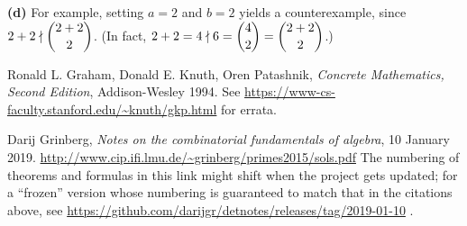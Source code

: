 \documentclass[paper=a4, fontsize=12pt]{scrartcl}%
\theoremstyle{plainsl}
\theoremstyle{definition}
\theoremstyle{remark}
\begin{document}
\textbf{(d)} For example, setting $a=2$ and $b=2$ yields a counterexample,
since $2+2\nmid\dbinom{2+2}{2}$. (In fact, $2+2=4\nmid6=\dbinom{4}{2}%
=\dbinom{2+2}{2}$.)

\begin{thebibliography}{99999999}                                                                                         %






Ronald L. Graham, Donald E. Knuth, Oren Patashnik,
\textit{Concrete Mathematics, Second Edition}, Addison-Wesley 1994.\newline
See \url{https://www-cs-faculty.stanford.edu/~knuth/gkp.html} for errata.

Darij Grinberg, \textit{Notes on the combinatorial
fundamentals of algebra}, 10 January 2019. \newline%
\url{http://www.cip.ifi.lmu.de/~grinberg/primes2015/sols.pdf} \newline The
numbering of theorems and formulas in this link might shift when the project
gets updated; for a ``frozen'' version whose numbering is guaranteed to match
that in the citations above, see
\url{https://github.com/darijgr/detnotes/releases/tag/2019-01-10} .
\end{thebibliography}
\end{document}
